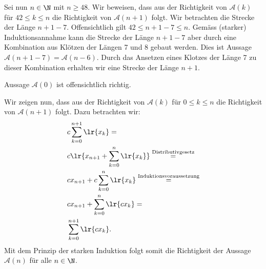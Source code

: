 \begin{myanswer}[myexercise:0210]
\begin{aenum}
		Sei nun $n\in\N$ mit $n\geq 48$. Wir beweisen, dass aus der Richtigkeit von $\mathcal{A}(k)$ für $42\leq k \leq n$ die Richtigkeit von $\mathcal{A}(n+1)$ folgt. Wir betrachten die Strecke der Länge $n+1-7$. Offensichtlich gilt $42\leq n+1-7\leq n$. Gemäss (starker) Induktionsannahme kann die Strecke der Länge $n+1-7$ aber durch eine Kombination aus Klötzen der Längen 7 und 8 gebaut werden. Dies ist Aussage $\mathcal{A}(n+1-7) = \mathcal{A}(n-6)$. Durch das Ansetzen eines Klotzes der Länge 7 zu dieser Kombination erhalten wir eine Strecke der Länge $n+1$.
	\end{aenum}
\end{myanswer}
\clearpage
\begin{myanswer}[myexercise:0295]
	Aussage $\mathcal{A}(0)$ ist offensichtlich richtig.

	Wir zeigen nun, dass aus der Richtigkeit von $\mathcal{A}(k)$ für $0\leq k\leq n$ die Richtigkeit von $\mathcal{A}(n+1)$ folgt. Dazu betrachten wir:
	\begin{align*}
		 & c\sum_{k=0}^{n+1}\lr{x_k} =                                                     \\
		 & c\lr{x_{n+1} + \sum_{k=0}^{n}\lr{x_k}} \stackrel{\text{Distributivgesetz}}{=}   \\
		 & cx_{n+1} + c\sum_{k=0}^{n}\lr{x_k} \stackrel{\text{Induktionsvoraussetzung}}{=} \\
		 & cx_{n+1} + \sum_{k=0}^{n}\lr{cx_k} =                                            \\
		 & \sum_{k=0}^{n+1}\lr{cx_k}.
	\end{align*}
	Mit dem Prinzip der starken Induktion folgt somit die Richtigkeit der Aussage $\mathcal{A}(n)$ für alle $n\in\N$.
\end{myanswer}
